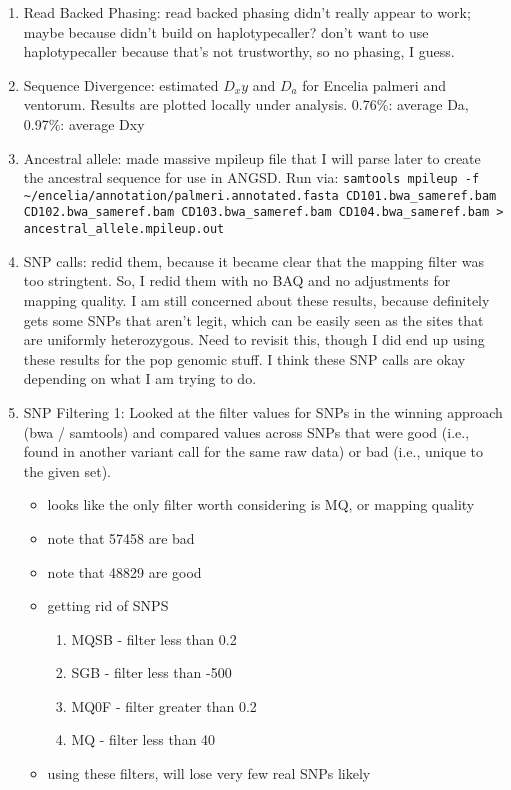 \documentclass[idxtotoc,hyperref,openany,oneside]{labbook} %
\begin{document}
\begin{enumerate}
\item Read Backed Phasing: read backed phasing didn't really appear to work; maybe because didn't build on haplotypecaller? don't want to use haplotypecaller because that's not trustworthy, so no phasing, I guess.
\item Sequence Divergence: estimated $D_xy$ and $D_a$ for Encelia palmeri and ventorum. Results are plotted locally under analysis. 0.76\%: average Da, 0.97\%: average Dxy
\item Ancestral allele: made massive mpileup file that I will parse later to create the ancestral sequence for use in ANGSD. Run via: \verb+samtools mpileup -f ~/encelia/annotation/palmeri.annotated.fasta CD101.bwa_sameref.bam CD102.bwa_sameref.bam CD103.bwa_sameref.bam CD104.bwa_sameref.bam > ancestral_allele.mpileup.out+
\item SNP calls: redid them, because it became clear that the mapping filter was too stringtent. So, I redid them with no BAQ and no adjustments for mapping quality. I am still concerned about these results, because definitely gets some SNPs that aren't legit, which can be easily seen as the sites that are uniformly heterozygous. Need to revisit this, though I did end up using these results for the pop genomic stuff. I think these SNP calls are okay depending on what I am trying to do.
\item SNP Filtering 1: Looked at the filter values for SNPs in the winning approach (bwa / samtools) and compared values across SNPs that were good (i.e., found in another variant call for the same raw data) or bad (i.e., unique to the given set).
\begin{itemize}
\item looks like the only filter worth considering is MQ, or mapping quality
\item note that 57458 are bad
\item note that 48829 are good
\item getting rid of SNPS
\begin{enumerate} 
\item MQSB - filter less than 0.2 
\item SGB - filter less than -500 
\item MQ0F - filter greater than 0.2 
\item MQ - filter less than 40 
\end{enumerate}
\item using these filters, will lose very few real SNPs likely

\end{itemize}
\end{enumerate}
\end{document}
